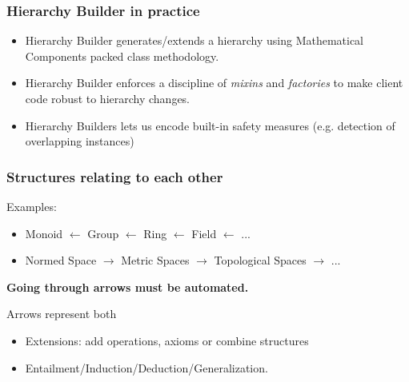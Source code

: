 \documentclass[11pt]{beamer}
\def\mathcomp{{\small\textsc{Mathematical Components}}}
\def\mathcomp{{\sc Mathematical Components}}
\begin{document}
\begin{frame}
  \frametitle{Hierarchy Builder in practice}

  \begin{itemize}
  \item Hierarchy Builder generates/extends a hierarchy using \mathcomp{}
    packed class methodology.
    \vfill
  \item Hierarchy Builder enforces a discipline of \emph{mixins} and
    \emph{factories} to make client code robust to hierarchy changes.
    \vfill
  \item Hierarchy Builders lets us encode built-in safety measures
    (e.g. detection of overlapping instances)
  \end{itemize}
\end{frame}


\begin{frame}[fragile]
  \frametitle{Structures relating to each other}

  Examples:

  \begin{itemize}
  \item Monoid $\leftarrow$ Group $\leftarrow$ Ring $\leftarrow$ Field
    $\leftarrow$ ...


  \item Normed Space $\rightarrow$ Metric Spaces $\rightarrow$
    Topological Spaces $\rightarrow$ ...

  \end{itemize}

  \pause
  \vfill{}

  \textbf{Going through arrows must be automated.}

  \pause
  \vfill{}

  Arrows represent both
  \begin{itemize}
  \item Extensions: add operations, axioms or combine structures
  \item Entailment/Induction/Deduction/Generalization.
  \end{itemize}

\end{frame}
\end{document}
